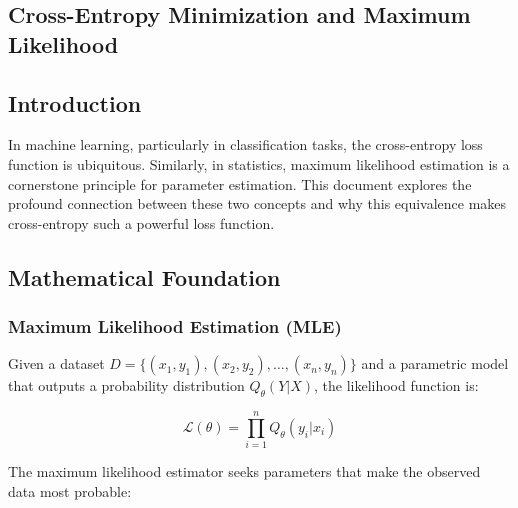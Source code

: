 \begin{notechapter}
\chapter{Cross-Entropy Minimization and Maximum Likelihood}\label{ch:ce-mle-equivalence}

\begin{abstract}
    This document provides a detailed explanation of the fundamental equivalence between cross-entropy minimization and maximum likelihood estimation. We prove this equivalence mathematically, provide intuitive explanations, demonstrate it with concrete examples, and explore its implications across various machine learning scenarios including classification, regression, and other probabilistic models.
\end{abstract}

\section{Introduction}

In machine learning, particularly in classification tasks, the cross-entropy loss function is ubiquitous. Similarly, in statistics, maximum likelihood estimation is a cornerstone principle for parameter estimation. This document explores the profound connection between these two concepts and why this equivalence makes cross-entropy such a powerful loss function.

\section{Mathematical Foundation}

\subsection{Maximum Likelihood Estimation (MLE)}

Given a dataset $D = \{(x_1, y_1), (x_2, y_2), \ldots, (x_n, y_n)\}$ and a parametric model that outputs a probability distribution $Q_\theta(Y|X)$, the likelihood function is:

\begin{definition}
\[
\mathcal{L}(\theta) = \prod_{i=1}^n Q_\theta(y_i | x_i)
\]
\end{definition}

The maximum likelihood estimator seeks parameters that make the observed data most probable:


\end{notechapter}
